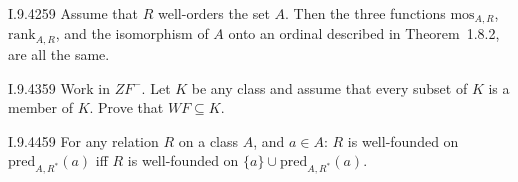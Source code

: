 \begin{lexcopy}{I.9.42}{59}
Assume that $R$ well-orders the set $A$. Then the three 
functions \(\textrm{mos}_{A,R}\), \(\textrm{rank}_{A,R}\),
and the isomorphism of $A$ onto an ordinal described in
Theorem~1.8.2, are all the same.
\end{lexcopy}
\unfinished

\begin{lexcopy}{I.9.43}{59}
Work in \(ZF^-\). Let $K$ be any class and assume that every
subset of $K$ is a member of $K$. Prove that \(WF \subseteq K\).
\end{lexcopy}
\unfinished

\begin{lexcopy}{I.9.44}{59}
For any relation $R$ on a class $A$, and \(a \in A\): $R$
is well-founded on \(\textrm{pred}_{A,R^*}(a)\) iff $R$
is well-founded on \(\{a\} \cup \textrm{pred}_{A,R^*}(a)\).
\end{lexcopy}
\unfinished

